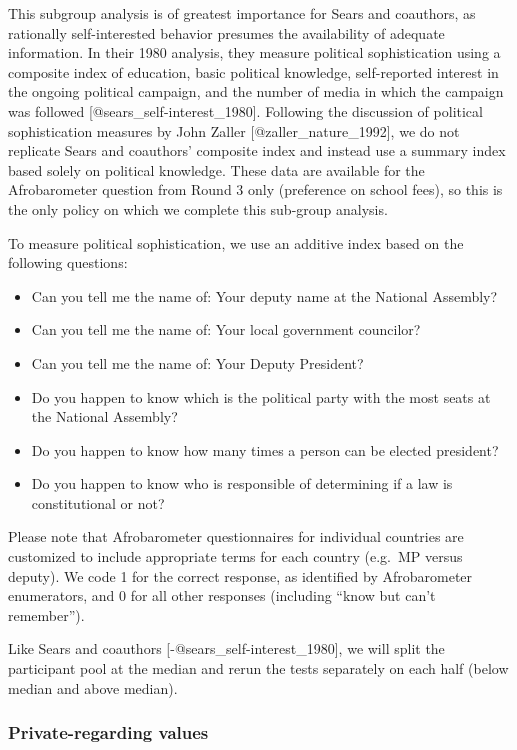 \documentclass[]{article}
\begin{document}
This subgroup analysis is of greatest importance for Sears and
coauthors, as rationally self-interested behavior presumes the
availability of adequate information. In their 1980 analysis, they
measure political sophistication using a composite index of education,
basic political knowledge, self-reported interest in the ongoing
political campaign, and the number of media in which the campaign was
followed {[}@sears\_self-interest\_1980{]}. Following the discussion of
political sophistication measures by John Zaller
{[}@zaller\_nature\_1992{]}, we do not replicate Sears and coauthors'
composite index and instead use a summary index based solely on
political knowledge. These data are available for the Afrobarometer
question from Round 3 only (preference on school fees), so this is the
only policy on which we complete this sub-group analysis.

To measure political sophistication, we use an additive index based on
the following questions:

\begin{itemize}
  \item Can you tell me the name of: Your deputy name at the National Assembly?
  \item Can you tell me the name of: Your local government councilor?
  \item Can you tell me the name of: Your Deputy President?
  \item Do you happen to know which is the political party with the most seats at the National Assembly?
  \item Do you happen to know how many times a person can be elected president?
  \item Do you happen to know who is responsible of determining if a law is constitutional or not?
\end{itemize}

Please note that Afrobarometer questionnaires for individual countries
are customized to include appropriate terms for each country (e.g.~MP
versus deputy). We code 1 for the correct response, as identified by
Afrobarometer enumerators, and 0 for all other responses (including
``know but can't remember'').

Like Sears and coauthors {[}-@sears\_self-interest\_1980{]}, we will
split the participant pool at the median and rerun the tests separately
on each half (below median and above median).

\subsubsection{Private-regarding values}\label{private-regarding-values}
\end{document}
